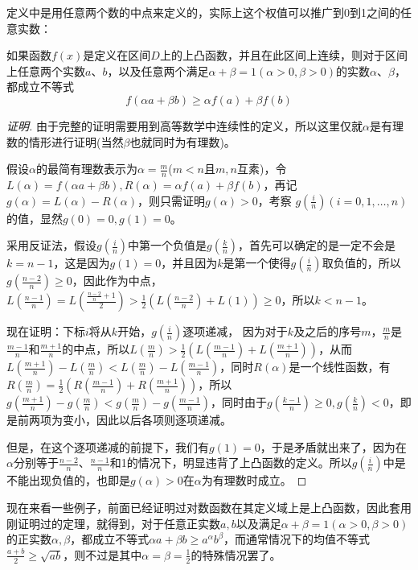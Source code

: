 定义中是用任意两个数的中点来定义的，实际上这个权值可以推广到0到1之间的任意实数：
\begin{theorem}
  \label{theorem:convexity-function-with-weight}
  如果函数$f(x)$是定义在区间$D$上的上凸函数，并且在此区间上连续，则对于区间上任意两个实数$a$、$b$，以及任意两个满足$\alpha + \beta = 1(\alpha >0, \beta>0)$的实数$\alpha$、$\beta$，都成立不等式
  \begin{equation}
    \label{eq:convexity-function-with-weight}
    f(\alpha a + \beta b) \geqslant \alpha f(a) + \beta f(b) 
  \end{equation}
\end{theorem}

\begin{proof}[证明]
  由于完整的证明需要用到高等数学中连续性的定义，所以这里仅就$\alpha$是有理数的情形进行证明(当然$\beta$也就同时为有理数)。

假设$\alpha$的最简有理数表示为$\alpha=\frac{m}{n}$($m<n$且$m,n$互素)，令$L(\alpha)=f(\alpha a + \beta b), R(\alpha)=\alpha f(a)+\beta f(b)$，再记 $g(\alpha) = L(\alpha) - R(\alpha)$，则只需证明$g(\alpha)>0$，考察 $ g(\frac{i}{n})(i=0,1,\ldots,n)$的值，显然$g(0)=0, g(1)=0$。

采用反证法，假设$g(\frac{i}{n})$中第一个负值是$g(\frac{k}{n})$，首先可以确定的是一定不会是$k=n-1$，这是因为$g(1)=0$，并且因为$k$是第一个使得$g(\frac{i}{n})$取负值的，所以$g(\frac{n-2}{n}) \geqslant 0$，因此作为中点，$L(\frac{n-1}{n})=L(\frac{\frac{n-2}{n}+1}{2})>\frac{1}{2}\left(L(\frac{n-2}{n}) + L(1)\right) \geqslant 0$，所以$k<n-1$。

现在证明：下标$i$将从$k$开始，$g(\frac{i}{n})$逐项递减， 因为对于$k$及之后的序号$m$，$\frac{m}{n}$是$\frac{m-1}{n}$和$\frac{m+1}{n}$的中点，所以$L\left( \frac{m}{n} \right) > \frac{1}{2} \left( L(\frac{m-1}{n}) + L(\frac{m+1}{n}) \right)$，从而$L(\frac{m+1}{n})-L(\frac{m}{n})<L(\frac{m}{n})-L(\frac{m-1}{n})$，同时$R(\alpha)$是一个线性函数，有$R(\frac{m}{n})=\frac{1}{2}\left( R(\frac{m-1}{n})+R(\frac{m+1}{n}) \right)$，所以$g(\frac{m+1}{n})-g(\frac{m}{n})<g(\frac{m}{n})-g(\frac{m-1}{n})$，同时由于$g(\frac{k-1}{n}) \geqslant 0,g(\frac{k}{n})<0$，即是前两项为变小，因此以后各项则逐项递减。

但是，在这个逐项递减的前提下，我们有$g(1)=0$，于是矛盾就出来了，因为在$\alpha$分别等于$\frac{n-2}{n}$、$\frac{n-1}{n}$和1的情况下，明显违背了上凸函数的定义。所以$g(\frac{i}{n})$中是不能出现负值的，也即是$g(\alpha)>0$在$\alpha$为有理数时成立。
\end{proof}

现在来看一些例子，前面已经证明过对数函数在其定义域上是上凸函数，因此套用刚证明过的定理，就得到，对于任意正实数$a,b$以及满足$\alpha+\beta=1(\alpha>0,\beta>0)$的正实数$\alpha,\beta$，都成立不等式$\alpha a + \beta b \geqslant a^{\alpha}b^{\beta}$，而通常情况下的均值不等式$\frac{a+b}{2}\geqslant \sqrt{ab}$，则不过是其中$\alpha=\beta=\frac{1}{2}$的特殊情况罢了。

